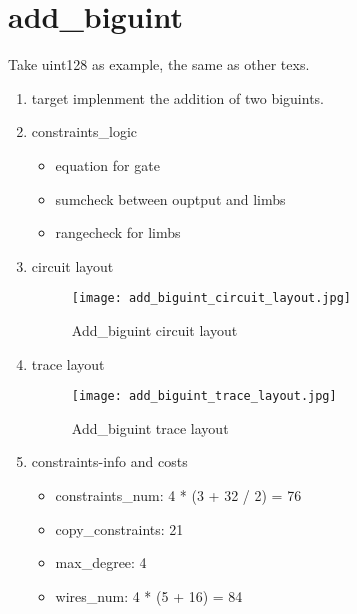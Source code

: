 \section{add_biguint}
\label{add_biguint}

Take uint128 as example, the same as other texs.

\begin{enumerate}
    \item target
        implenment the addition of two biguints.
    \item constraints_logic
        \begin{itemize}
            \item equation for gate
            \item sumcheck between ouptput and limbs
            \item rangecheck for limbs
        \end{itemize}
    \item circuit layout
        \begin{figure}[!ht]
            \centering
            \texttt{[image: add\_biguint\_circuit\_layout.jpg]}
            \caption{Add_biguint circuit layout}
            \label{fig:add_biguint_circuit_layout}
        \end{figure}

    \item trace layout
        \begin{figure}[!ht]
            \centering
            \texttt{[image: add\_biguint\_trace\_layout.jpg]}
            \caption{Add_biguint trace layout}
            \label{fig:add_biguint_trace_layout}
        \end{figure}
    
    \item constraints-info and costs
        \begin{itemize}
            \item constraints_num: 4 * (3 + 32 / 2) = 76
            \item copy_constraints: 21
            \item max_degree: 4
            \item wires_num: 4 * (5 + 16) = 84
        \end{itemize}


\end{enumerate}